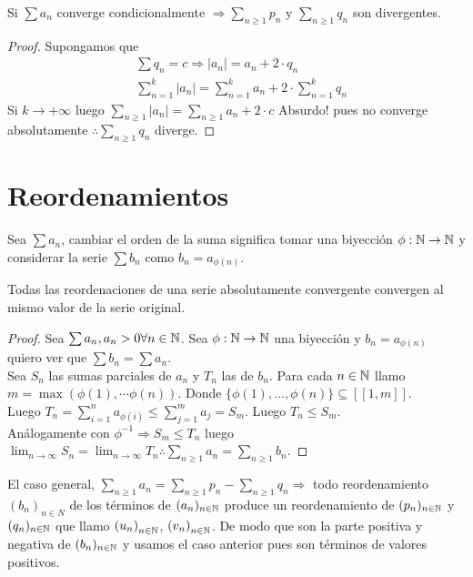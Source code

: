 \begin{theorem}
  Si \(\sum a_n\) converge condicionalmente \(\Rightarrow \sum_{n \geq 1} p_n\) y \(\sum_{n \geq 1} q_n\) son divergentes.

  \begin{proof}
    Supongamos que \begin{align*}
      & \sum q_n = c \Rightarrow |a_n| = a_n + 2 \cdot q_n \\
      & \sum_{n = 1}^k |a_n| = \sum_{n = 1}^k a_n + 2 \cdot \sum_{n = 1}^k q_n
    \end{align*}
    Si \(k \to +\infty\) luego \(\sum_{n \geq 1} |a_n| = \sum_{n \geq 1} a_n + 2 \cdot c\) Absurdo! pues no converge absolutamente \(\therefore \sum_{n \geq 1} q_n\) diverge.
  \end{proof}
\end{theorem}

\section{Reordenamientos}

\begin{definition}
  Sea \(\sum a_n\), cambiar el orden de la suma significa tomar una biyección \(\phi: \mathbb{N} \to \mathbb{N} \) y considerar la serie \(\sum b_n\) como \(b_n = a_{\phi(n)} \).
\end{definition}

\begin{theorem}
  Todas las reordenaciones de una serie absolutamente convergente convergen al mismo valor de la serie original.
  \begin{proof}
    Sea \(\sum a_n, a_n > 0 \forall n \in \mathbb{N} \). Sea \(\phi: \mathbb{N} \to \mathbb{N} \) una biyección y \(b_n = a_{\phi(n)} \) quiero ver que \(\sum b_n = \sum a_n\). \\
    Sea \(S_n\) las sumas parciales de \(a_n\) y \(T_n\) las de \(b_n\). Para cada \(n \in \mathbb{N} \) llamo \(m = \max(\phi(1), \cdots \phi(n))\). Donde \(\{ \phi(1), \ldots, \phi(n) \} \subseteq [ [ 1, m ] ] \). \\
    Luego \(T_n = \sum_{i = 1}^n a_{\phi(i)} \leq \sum_{j = 1}^m a_j = S_m\). Luego \(T_n \leq S_m\). \\
    Análogamente con \(\phi^{-1} \Rightarrow S_m \leq T_n\) luego \(\lim_{n \to \infty} S_n = \lim_{n \to \infty} T_n \therefore \sum_{n \geq 1} a_n = \sum_{n \geq 1} b_n\).
  \end{proof}
\end{theorem}

El caso general, \(\sum_{n \geq 1} a_n = \sum_{n \geq 1} p_n - \sum_{n \geq 1} q_n \Rightarrow \) todo reordenamiento \((b_n)_{n \in N} \) de los términos de \((a_n)_{n \in \mathbb{N}} \) produce un reordenamiento de \((p_n)_{n \in \mathbb{N}} \) y \((q_n)_{n \in \mathbb{N}} \) que llamo \({(u_n)}_{n \in \mathbb{N}} \), \({(v_n)}_{n \in \mathbb{N}} \). De modo que son la parte positiva y negativa de \((b_n)_{n \in \mathbb{N}} \) y usamos el caso anterior pues son términos de valores positivos.

